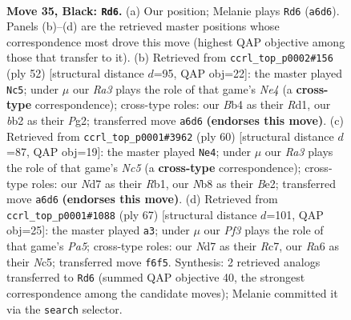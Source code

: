 \documentclass[11pt]{article}
\begin{document}
\clearpage

\begin{figure}[p]\centering
\begin{subfigure}{0.46\textwidth}\centering
\resizebox{\linewidth}{!}{%
\newchessgame
\chessboard[
  setfen={1nb2k2/1pNn4/r4p2/p2p2p1/1b4Pp/1P2P2P/PB2PK2/1R1B4 b - - 5 35},
  showmover=false,
  pgfstyle=straightmove, color=movearrow, markmove={a6-d6}
]}
\caption{}
\end{subfigure}\hfill
\begin{subfigure}{0.46\textwidth}\centering
\resizebox{\linewidth}{!}{%
\newchessgame
\chessboard[
  setfen={r5k1/pp4bp/4b1p1/4pp2/P3Nn1B/2P4P/1PB2PP1/3R2K1 w - - 0 27},
  showmover=false,
  pgfstyle=straightmove, color=movearrow, markmove={e4-c5}
]}
\caption{}
\end{subfigure}
\\[4pt]
\begin{subfigure}{0.46\textwidth}\centering
\resizebox{\linewidth}{!}{%
\newchessgame
\chessboard[
  setfen={1r2b3/n3kppp/1p2p3/pPNnP3/P7/5NP1/4BP1P/1R3K2 w - - 0 31},
  showmover=false,
  pgfstyle=straightmove, color=movearrow, markmove={c5-e4}
]}
\caption{}
\end{subfigure}\hfill
\begin{subfigure}{0.46\textwidth}\centering
\resizebox{\linewidth}{!}{%
\newchessgame
\chessboard[
  setfen={8/2r1kp2/3bp1p1/1pn4p/p2B1P1P/2P3P1/PP2B1K1/R7 b - - 5 34},
  showmover=false,
  pgfstyle=straightmove, color=movearrow, markmove={a4-a3}
]}
\caption{}
\end{subfigure}
\caption{\textbf{Move 35, Black: \texttt{Rd6}.} (a) Our position; Melanie plays \texttt{Rd6} (\texttt{a6d6}). Panels (b)--(d) are the retrieved master positions whose correspondence most drove this move (highest QAP objective among those that transfer to it). (b) Retrieved from \texttt{ccrl\_top\_p0002\#156} (ply 52) [structural distance $d$=95, QAP obj=22]: the master played \texttt{Nc5}; under $\mu$ our \emph{Ra3} plays the role of that game's \emph{Ne4} (a \textbf{cross-type} correspondence); cross-type roles: our \emph{B}b4 as their \emph{R}d1, our \emph{b}b2 as their \emph{P}g2; transferred move \texttt{a6d6} \textbf{(endorses this move)}. (c) Retrieved from \texttt{ccrl\_top\_p0001\#3962} (ply 60) [structural distance $d$=87, QAP obj=19]: the master played \texttt{Ne4}; under $\mu$ our \emph{Ra3} plays the role of that game's \emph{Nc5} (a \textbf{cross-type} correspondence); cross-type roles: our \emph{N}d7 as their \emph{R}b1, our \emph{N}b8 as their \emph{B}e2; transferred move \texttt{a6d6} \textbf{(endorses this move)}. (d) Retrieved from \texttt{ccrl\_top\_p0001\#1088} (ply 67) [structural distance $d$=101, QAP obj=25]: the master played \texttt{a3}; under $\mu$ our \emph{Pf3} plays the role of that game's \emph{Pa5}; cross-type roles: our \emph{N}d7 as their \emph{R}c7, our \emph{R}a6 as their \emph{N}c5; transferred move \texttt{f6f5}. Synthesis: 2 retrieved analogs transferred to \texttt{Rd6} (summed QAP objective 40, the strongest correspondence among the candidate moves); Melanie committed it via the \texttt{search} selector.}
\label{fig:thought-m69}
\end{figure}
\end{document}
